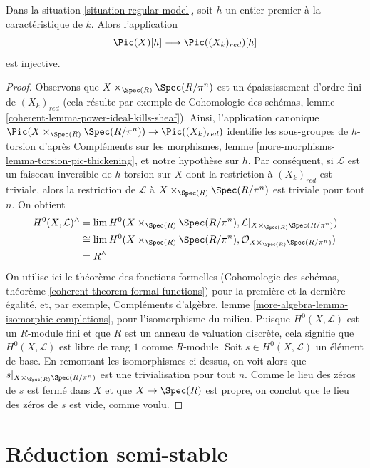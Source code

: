 \begin{lemma}
\label{lemma-torsion-embeds}
Dans la situation \ref{situation-regular-model}, soit $h$ un entier premier
à la caractéristique de $k$. Alors l'application
$$
\Pic(X)[h] \longrightarrow \Pic((X_k)_{red})[h]
$$
est injective.
\end{lemma}

\begin{proof}
Observons que $X\times_{\Spec(R)}\Spec(R/\pi^n)$ est un épaississement
d'ordre fini de $(X_k)_{red}$ (cela résulte par exemple de Cohomologie des
schémas, lemme \ref{coherent-lemma-power-ideal-kills-sheaf}). Ainsi,
l'application canonique
$\Pic(X\times_{\Spec(R)}\Spec(R/\pi^n))\to\Pic((X_k)_{red})$ identifie les
sous-groupes de $h$-torsion d'après Compléments sur les morphismes, lemme
\ref{more-morphisms-lemma-torsion-pic-thickening}, et notre hypothèse sur
$h$. Par conséquent, si $\mathcal{L}$ est un faisceau inversible de
$h$-torsion sur $X$ dont la restriction à $(X_k)_{red}$ est triviale, alors
la restriction de $\mathcal{L}$ à
$X\times_{\Spec(R)}\Spec(R/\pi^n)$ est triviale pour tout $n$.
On obtient
\begin{align*}
H^0(X, \mathcal{L})^\wedge
& =
\lim H^0(X \times_{\Spec(R)} \Spec(R/\pi^n),
\mathcal{L}|_{X \times_{\Spec(R)} \Spec(R/\pi^n)}) \\
& \cong
\lim H^0(X \times_{\Spec(R)} \Spec(R/\pi^n),
\mathcal{O}_{X \times_{\Spec(R)} \Spec(R/\pi^n)}) \\
& =
R^\wedge
\end{align*}
On utilise ici le théorème des fonctions formelles (Cohomologie des schémas,
théorème \ref{coherent-theorem-formal-functions}) pour la première et la
dernière égalité, et, par exemple, Compléments d'algèbre, lemme
\ref{more-algebra-lemma-isomorphic-completions}, pour l'isomorphisme du
milieu. Puisque $H^0(X,\mathcal{L})$ est un $R$-module fini et que $R$ est
un anneau de valuation discrète, cela signifie que
$H^0(X,\mathcal{L})$ est libre de rang $1$ comme $R$-module.
Soit $s\in H^0(X,\mathcal{L})$ un élément de base. En remontant les
isomorphismes ci-dessus, on voit alors que
$s|_{X\times_{\Spec(R)}\Spec(R/\pi^n)}$ est une trivialisation pour tout
$n$. Comme le lieu des zéros de $s$ est fermé dans $X$ et que
$X\to\Spec(R)$ est propre, on conclut que le lieu des zéros de $s$ est vide,
comme voulu.
\end{proof}






\section{Réduction semi-stable}
\label{section-semistable-reduction}

